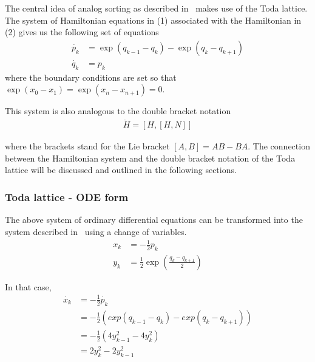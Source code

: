 

% 




The central idea of analog sorting as described in~\cite{bloch, brockett} makes use of the Toda lattice. The system of Hamiltonian equations in (1) associated with the Hamiltonian in (2) gives us the following set of equations
\begin{align*}
\dot{p_k} &= \exp(q_{k-1}-q_{k})-\exp(q_{k}-q_{k+1}) \\
\dot{q_k} &= p_k
\end{align*}
where the boundary conditions are set so that $\exp(x_0-x_1)=\exp (x_n-x_{n+1})=0$.

This system is also analogous to the double bracket notation 
\begin{align}
\dot{H} = [H,[H,N]]
\end{align}

where the brackets stand for the Lie bracket $[A,B] = AB-BA$. The connection between the Hamiltonian system  and the double bracket notation of the Toda lattice will be discussed and outlined in the following sections.

\subsubsection{Toda lattice - ODE form}

The above system of ordinary differential equations can be transformed into the system described in~\cite{harvard_robo} using a change of variables.
\begin{align}
x_k &= -\frac{1}{2}p_k \nonumber \\
y_k &= \frac{1}{2}\exp(\frac{q_k-q_{k+1}}{2})
\end{align}

In that case, 
\begin{align*}
    \dot{x_k} &= -\frac{1}{2}\dot{p_k} \\
              &= -\frac{1}{2}(exp(q_{k-1}-q_{k})-exp(q_{k}-q_{k+1})) \\
              &= -\frac{1}{2}(4y^2_{k-1}-4y^2_k) \\
              &= 2y^2_k-2y^2_{k-1}
\end{align*}

